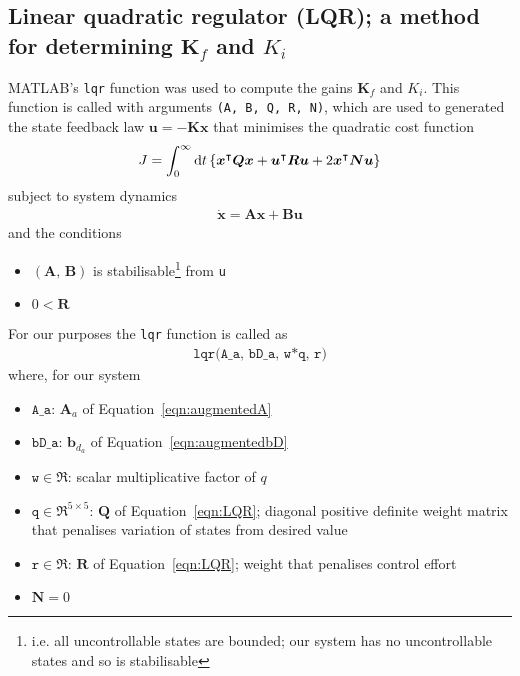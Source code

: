 \subsection{Linear quadratic regulator (LQR); a method for determining $\boldsymbol{K}_f$ and $K_i$}\label{sec:LQR}
\textsf{MATLAB}'s \texttt{lqr} function was used to compute the gains $\boldsymbol{K}_f$ and $K_i$. This function is called with arguments \texttt{(A, B, Q, R, N)}, which are used to generated the state feedback law $\boldsymbol{u} = -\boldsymbol{K}\boldsymbol{x}$ that minimises the quadratic cost function
\begin{align}
J = \int_0^\infty \mathrm{d}t\left\{\boldsymbol{x}^\intercal \boldsymbol{Q} \boldsymbol{x}
+ \boldsymbol{u}^\intercal \boldsymbol{R} \boldsymbol{u}
+ 2 \boldsymbol{x}^\intercal \boldsymbol{N} \boldsymbol{u}\right\}
\label{eqn:LQR}
\end{align}
subject to system dynamics
\begin{align*}
\boldsymbol{\dot{x}} = \boldsymbol{A}\boldsymbol{x} + \boldsymbol{B}\boldsymbol{u}
\end{align*}
and the conditions
\begin{itemize}
    \item $(\boldsymbol{A}, \, \boldsymbol{B})$ is stabilisable\footnote{i.e. all uncontrollable states are bounded; our system has no uncontrollable states and so is stabilisable} from \texttt{u}
    \item $0 < \boldsymbol{R}$
\end{itemize}
For our purposes the \texttt{lqr} function is called as
\begin{align*}
\texttt{lqr(A\_a, bD\_a, w*q, r)}
\end{align*}
where, for our system
\begin{itemize}
	\item $\texttt{A\_a}$: $\boldsymbol{A}_a$ of Equation~\ref{eqn:augmentedA}
	\item $\texttt{bD\_a}$: $\boldsymbol{b}_{d_a}$ of Equation~\ref{eqn:augmentedbD}
	\item $\texttt{w} \in \Re$: scalar multiplicative factor of $q$
	\item $\texttt{q}\in \Re^{5 \times 5}$: $\boldsymbol{Q}$ of Equation~\ref{eqn:LQR}; diagonal positive definite weight matrix that penalises variation of states from desired value
	\item $\texttt{r} \in \Re$: $\boldsymbol{R}$ of Equation~\ref{eqn:LQR}; weight that penalises control effort
	\item $\boldsymbol{N} = 0$
\end{itemize}
